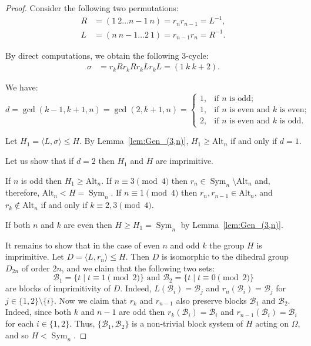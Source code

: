 \documentclass[
final
]{dmtcs-episciences}
\DeclareMathOperator{\Sym}{\mathrm{Sym}}
\begin{document}
\begin{proof} 

Consider the following two permutations:
\begin{align*}
	R &= (1\ 2 \dots n-1\ n)=r_{n}r_{n-1} = L^{-1},\\
	L &= (n\ n-1\dots 2\ 1) =r_{n-1}r_{n} = R^{-1}.
\end{align*}

By direct computations, we obtain the following 3-cycle:
\begin{align*}
	\sigma &= r_k R r_k R r_k L r_k L = (1 \ k\ k+2).
\end{align*}

We have:
$$
d = \gcd(k-1, k+1, n) = \gcd(2, k+1, n) = 
\begin{cases}
	1, & \text{if $n$ is odd}; \\[6pt]
	1, & \text{if $n$ is even and $k$ is even}; \\[6pt]
	2, & \text{if $n$ is even and $k$ is odd}.
\end{cases}
$$

Let $H_1 = \langle L, \sigma \rangle \leqslant H$.
By Lemma~\ref{lem:Gen_(3,n)}, $H_1 \geqslant \mathrm{Alt}_n$ if and only if $d = 1$. 

Let us show that if $d=2$ then $H_1$ and $H$ are imprimitive.

If $n$ is odd then $H_1 \geqslant \mathrm{Alt}_n$. If $n \equiv 3 \pmod{4}$ then $r_n \in \Sym_n \setminus \mathrm{Alt}_n$ and, therefore, $\mathrm{Alt}_n < H = \Sym_n$. If $n \equiv 1 \pmod{4}$ then $r_n, r_{n-1} \in \mathrm{Alt}_n$, and $r_k \not \in \mathrm{Alt}_n$ if and only if $k \equiv 2, 3 \pmod{4}$.

If both $n$ and $k$ are even then $H \geqslant H_1=\Sym_n$ by Lemma~\ref{lem:Gen_(3,n)}.

It remains to show that in the case of even $n$ and odd $k$ the group $H$ is imprimitive. Let $D = \langle L, r_n \rangle \leqslant H$. Then $D$ is isomorphic to the dihedral group $D_{2n}$ of order $2n$, and we claim that the following two sets: 
$$\mathcal{B}_1 = \{t \mid t \equiv 1\pmod{2}\}  \mbox{ and } \mathcal{B}_2 = \{t \mid t \equiv 0\pmod{2}\}$$ 
are blocks of imprimitivity of $D$. Indeed, $L(\mathcal{B}_i)=\mathcal{B}_j$ and $r_n(\mathcal{B}_i)=\mathcal{B}_j$ for $j\in \{1,2\}\setminus\{i\}$. Now we claim that $r_k$ and $r_{n-1}$ also preserve blocks $\mathcal{B}_1$ and $\mathcal{B}_2$. Indeed, since both $k$ and $n-1$ are odd then $r_k(\mathcal{B}_i)=\mathcal{B}_i$ and $r_{n-1}(\mathcal{B}_i)=\mathcal{B}_i$ for each $i \in \{1,2\}$.  Thus, $\{\mathcal{B}_1, \mathcal{B}_2\}$ is a non-trivial block system of $H$ acting on $\Omega$, and so $H<\Sym_n$.
\end{proof}
\end{document}
